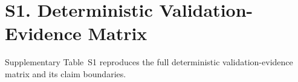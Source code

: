 \section{S1. Deterministic Validation-Evidence Matrix}

Supplementary Table~S1 reproduces the full deterministic validation-evidence matrix and its claim boundaries.



